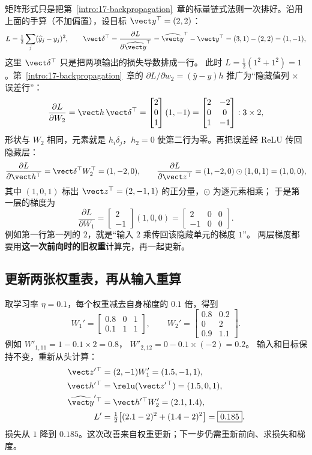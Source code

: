 矩阵形式只是把第~\ref*{intro:17-backpropagation}~章的标量链式法则一次排好。沿用上面的手算（不加偏置），设目标 $\vect y^\top=(2,2)$：
\[
L=\tfrac12\sum_j(\widehat{y}_j-y_j)^2,\qquad
\vect\delta^\top=\frac{\partial L}{\partial\widehat{\vect y}^\top}
=\widehat{\vect y}^\top-\vect y^\top=(3,1)-(2,2)=(1,-1),
\]
这里 $\vect\delta^\top$ 只是把两项输出的损失导数排成一行。
此时 $L=\tfrac12(1^2+1^2)=1$。第~\ref*{intro:17-backpropagation}~章的
$\partial L/\partial w_2=(\widehat{y}-y)h$ 推广为“隐藏值列 $\times$ 误差行”：
\[
\frac{\partial L}{\partial W_2}=\vect h\,\vect\delta^\top
=\begin{bmatrix}2\\0\\1\end{bmatrix}(1,-1)
=\begin{bmatrix}2&-2\\0&0\\1&-1\end{bmatrix}:3\times2,
\]
形状与 $W_2$ 相同，元素就是 $h_i\delta_j$，$h_2=0$ 使第二行为零。再把误差经 ReLU 传回隐藏层：
\[
\frac{\partial L}{\partial\vect h^\top}=\vect\delta^\top W_2^\top=(1,-2,0),\qquad
\frac{\partial L}{\partial\vect z^\top}=(1,-2,0)\odot(1,0,1)=(1,0,0),
\]
其中 $(1,0,1)$ 标出 $\vect z^\top=(2,-1,1)$ 的正分量，$\odot$ 为逐元素相乘；
于是第一层的梯度为
\[
\frac{\partial L}{\partial W_1}
=\begin{bmatrix}2\\-1\end{bmatrix}(1,0,0)
=\begin{bmatrix}2&0&0\\-1&0&0\end{bmatrix}.
\]
例如第一行第一列的 $2$，就是“输入 $2$ 乘传回该隐藏单元的梯度 $1$”。
两层梯度都要用\textbf{这一次前向时的旧权重}计算完，再一起更新。

\subsection{更新两张权重表，再从输入重算}
\label{sec:mlp-update-check}

取学习率 $\eta=0.1$，每个权重减去自身梯度的 $0.1$ 倍，得到
\[
W_1'=\begin{bmatrix}0.8&0&1\\0.1&1&1\end{bmatrix},\qquad
W_2'=\begin{bmatrix}0.8&0.2\\0&2\\0.9&1.1\end{bmatrix}.
\]
例如 $W'_{1,11}=1-0.1\times2=0.8$，
$W'_{2,12}=0-0.1\times(-2)=0.2$。
输入和目标保持不变，重新从头计算：
\[
\begin{aligned}
\vect z'{}^\top&=(2,-1)W_1'=(1.5,-1,1),\\
\vect h'{}^\top&=\relu(\vect z'{}^\top)=(1.5,0,1),\\
\widehat{\vect y}'{}^\top&=\vect h'{}^\top W_2'=(2.1,1.4),\\
L'&=\tfrac12\bigl[(2.1-2)^2+(1.4-2)^2\bigr]=\boxed{0.185}.
\end{aligned}
\]
损失从 $1$ 降到 $0.185$。这次改善来自权重更新；下一步仍需重新前向、求损失和梯度。


